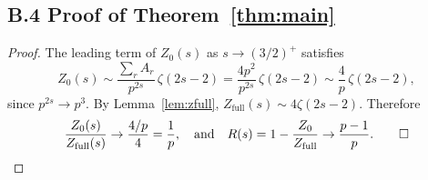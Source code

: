 \documentclass[12pt]{article}
\begin{document}
\subsection*{B.4 Proof of Theorem~\ref{thm:main}}

\begin{proof}
  The leading term of $Z_0(s)$ as $s\to(3/2)^+$ satisfies
  \[
    Z_0(s) \sim \frac{\sum_r A_r}{p^{2s}}\,\zeta(2s-2)
            = \frac{4p^2}{p^{2s}}\,\zeta(2s-2)
            \sim \frac{4}{p}\,\zeta(2s-2),
  \]
  since $p^{2s}\to p^3$. By Lemma~\ref{lem:zfull},
  $Z_{\mathrm{full}}(s)\sim 4\zeta(2s-2)$. Therefore
  \[
    \frac{Z_0(s)}{Z_{\mathrm{full}}(s)} \to \frac{4/p}{4} = \frac{1}{p},
    \quad\text{and}\quad
    R(s) = 1 - \frac{Z_0}{Z_{\mathrm{full}}} \to \frac{p-1}{p}.\qed
  \]
\end{proof}
\end{document}

